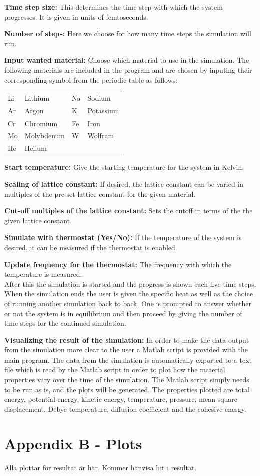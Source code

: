 \documentclass[12pt,a4paper]{article}
\begin{document}
\textbf{Time step size:} This determines the time step with which the system progresses. It is given in units of femtoseconds.

\textbf{Number of steps:} Here we choose for how many time steps the simulation will run.

\textbf{Input wanted material:} Choose which material to use in the simulation. The following materials are included in the program and are chosen by inputing their corresponding symbol from the periodic table as follows:

\begin{table}[h]
\begin{center}
\begin{tabular}{l l | l l}
Li & Lithium & Na & Sodium \\
Ar & Argon & K & Potassium \\
Cr & Chromium & Fe & Iron \\
Mo & Molybdenum & W & Wolfram \\
He & Helium & & \\
\end{tabular}
\end{center}
\end{table}


\textbf{Start temperature:} Give the starting temperature for the system in Kelvin.

\textbf{Scaling of lattice constant: }If desired, the lattice constant can be varied in multiples of the pre-set lattice constant for the given material. 

\textbf{Cut-off multiples of the lattice constant:} Sets the cutoff in terms of the the given lattice constant.

\textbf{Simulate with thermostat (Yes/No):} If the temperature of the system is desired, it can be measured if the thermostat is enabled. 

\textbf{Update frequency for the thermostat: }The frequency with which the temperature is measured. \\
After this the simulation is started and the progress is shown each five time steps. \\
When the simulation ends the user is given the specific heat as well as the choice of running another simulation back to back. One is prompted to answer whether or not the system is in equilibrium and then proceed by giving the number of time steps for the continued simulation. 

\textbf{Visualizing the result of the simulation:} 
In order to make the data output from the simulation more clear to the user a Matlab script is provided with the main program. The data from the simulation is automatically exported to a text file which is read by the Matlab script in order to plot how the material properties vary over the time of the simulation. The Matlab script simply needs to be run as is, and the plots will be generated. The properties plotted are total energy, potential energy, kinetic energy, temperature, pressure, mean square displacement, Debye temperature, diffusion coefficient and the cohesive energy.

\newpage
\section{Appendix B - Plots}
\label{sec:AppendixB}
Alla plottar för resultat är här. Kommer hänvisa hit i resultat.
\end{document}
